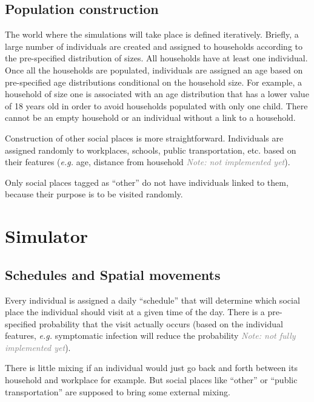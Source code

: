 \documentclass[11pt, onecolumn]{article}
\newcommand{\note}[1]{\textit{\textcolor{Grey}{Note: #1}}}
\newcommand{\eg}{\textit{e.g.}\xspace}
\begin{document}
\subsection{Population construction}

The world where the simulations will take place is defined iteratively. Briefly, a large number of individuals are created and assigned to households according to the pre-specified distribution of sizes. All households have at least one individual. Once all the households are populated, individuals are assigned an age based on pre-specified age distributions conditional on the household size. For example, a household of size one is associated with an age distribution that has a lower value of 18 years old in order to avoid households populated with only one child. There cannot be an empty household or an individual without a link to a household.

Construction of other social places is more straightforward. Individuals are assigned randomly to workplaces, schools, public transportation, etc. based on their features (\eg age, distance from household \note{not implemented yet}). 

Only social places tagged as ``other'' do not have individuals linked to them, because their purpose is to be visited randomly. 



\section{Simulator}

\subsection{Schedules and Spatial movements}

Every individual is assigned a daily ``schedule'' that will determine which social place the individual should visit at a given time of the day. There is a pre-specified probability that the visit actually occurs (based on the individual features, \eg symptomatic infection will reduce the probability \note{not fully implemented yet}).

There is little mixing if an individual would just go back and forth between its household and workplace for example. But social places like ``other'' or ``public transportation'' are supposed to bring some external mixing.
\end{document}
